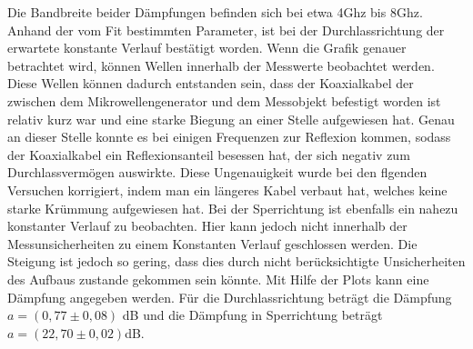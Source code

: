 Die Bandbreite beider Dämpfungen befinden sich bei etwa 4Ghz bis 8Ghz. Anhand der vom Fit bestimmten Parameter, ist bei der Durchlassrichtung der erwartete konstante Verlauf bestätigt worden. Wenn die Grafik genauer betrachtet wird, können Wellen innerhalb der Messwerte beobachtet werden. Diese Wellen können dadurch entstanden sein, dass der Koaxialkabel der zwischen dem Mikrowellengenerator und dem Messobjekt befestigt worden ist relativ kurz war und eine starke Biegung an einer Stelle aufgewiesen hat. Genau an dieser Stelle konnte es bei einigen Frequenzen zur Reflexion kommen, sodass der Koaxialkabel ein Reflexionsanteil besessen hat, der sich negativ zum Durchlassvermögen auswirkte. Diese Ungenauigkeit wurde bei den flgenden Versuchen korrigiert, indem man ein längeres Kabel verbaut hat, welches keine starke Krümmung aufgewiesen hat. Bei der Sperrichtung ist ebenfalls ein nahezu konstanter Verlauf zu beobachten. Hier kann jedoch nicht innerhalb der Messunsicherheiten zu einem Konstanten Verlauf geschlossen werden. Die Steigung ist jedoch so gering, dass dies durch nicht berücksichtigte Unsicherheiten des Aufbaus zustande gekommen sein könnte. Mit Hilfe der Plots kann eine Dämpfung angegeben werden. Für die Durchlassrichtung beträgt die Dämpfung $a = (0,77 \pm 0,08)$ dB und die Dämpfung in Sperrichtung beträgt
$a = (22,70 \pm 0,02)$dB.

